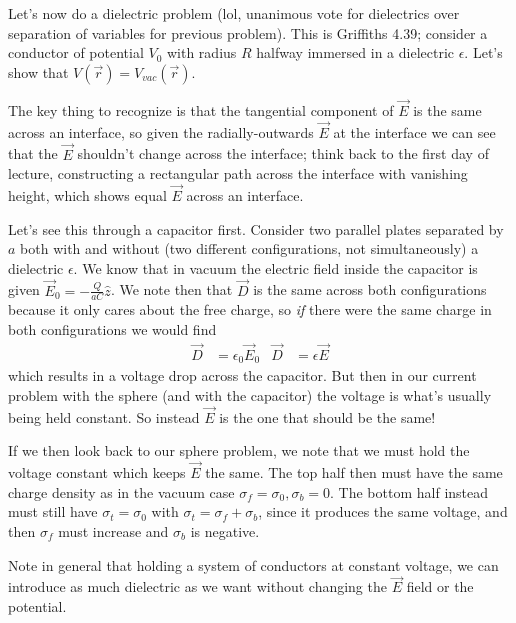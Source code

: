 \documentclass[10pt]{report}
\begin{document}
Let's now do a dielectric problem (lol, unanimous vote for dielectrics over separation of variables for previous problem). This is Griffiths 4.39; consider a conductor of potential $V_0$ with radius $R$ halfway immersed in a dielectric $\epsilon$. Let's show that $V(\vec{r}) = V_{vac}(\vec{r})$. 

The key thing to recognize is that the tangential component of $\vec{E}$ is the same across an interface, so given the radially-outwards $\vec{E}$ at the interface we can see that the $\vec{E}$ shouldn't change across the interface; think back to the first day of lecture, constructing a rectangular path across the interface with vanishing height, which shows equal $\vec{E}$ across an interface.

Let's see this through a capacitor first. Consider two parallel plates separated by $a$ both with and without (two different configurations, not simultaneously) a dielectric $\epsilon$. We know that in vacuum the electric field inside the capacitor is given $\vec{E}_0 = -\frac{Q}{aC}\hat{z}$. We note then that $\vec{D}$ is the same across both configurations because it only cares about the free charge, so \emph{if} there were the same charge in both configurations we would find
\begin{align}
    \vec{D} & = \epsilon_0\vec{E}_0& \vec{D} &= \epsilon \vec{E}
\end{align}
which results in a voltage drop across the capacitor. But then in our current problem with the sphere (and with the capacitor) the voltage is what's usually being held constant. So instead $\vec{E}$ is the one that should be the same!

If we then look back to our sphere problem, we note that we must hold the voltage constant which keeps $\vec{E}$ the same. The top half then must have the same charge density as in the vacuum case $\sigma_f = \sigma_0, \sigma_b = 0$. The bottom half instead must still have $\sigma_t = \sigma_0$ with $\sigma_t = \sigma_f + \sigma_b$, since it produces the same voltage, and then $\sigma_f$ must increase and $\sigma_b$ is negative. 

Note in general that holding a system of conductors at constant voltage, we can introduce as much dielectric as we want without changing the $\vec{E}$ field or the potential. 
\end{document}
